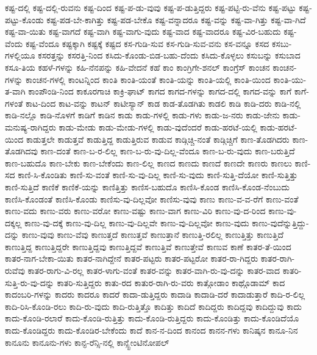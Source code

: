 {ಕಷ್ಟ-ದಲ್ಲಿ
ಕಷ್ಟ-ದಲ್ಲಿ-ರುವನು
ಕಷ್ಟ-ದಿಂದ
ಕಷ್ಟ-ಪ-ಡು-ವುವು
ಕಷ್ಟ-ಪ-ಡುತ್ತಿದ್ದರು
ಕಷ್ಟ-ಪಟ್ಟಿ-ರು-ವೆನು
ಕಷ್ಟ-ಪಟ್ಟು
ಕಷ್ಟ-ಪಟ್ಟು-ಕೊಂಡು
ಕಷ್ಟ-ಪಡ-ಬೇ-ಕಾಗಿತ್ತು
ಕಷ್ಟ-ಪಡ-ಬೇಕೊ
ಕಷ್ಟ-ವನ್ನಾದರೂ
ಕಷ್ಟ-ವನ್ನು
ಕಷ್ಟ-ವಾ-ಗಿತ್ತು
ಕಷ್ಟ-ವಾ-ಗಿದೆ
ಕಷ್ಟ-ವಾ-ಯಿತು
ಕಷ್ಟ-ವಾಗದೆ
ಕಷ್ಟ-ವಾಗಿ
ಕಷ್ಟ-ವಾಗು-ವುದು
ಕಷ್ಟ-ವಾದ
ಕಷ್ಟ-ವಾದರೂ
ಕಷ್ಟ-ವಿರ-ಬಹುದು
ಕಷ್ಟ-ವೆಂದು
ಕಷ್ಟ-ವೆಂದೂ
ಕಷ್ಟಕ್ಕಾಗಿ
ಕಷ್ಟಕ್ಕೆ
ಕಷ್ಟದ
ಕಸ-ಗುಡಿ-ಸುವ
ಕಸ-ಗುಡಿ-ಸುವ-ವನು
ಕಸ-ವನ್ನೂ
ಕಸದ
ಕಸಬು-ಗಳಲ್ಲಿಯೂ
ಕಸರತ್ತನ್ನು
ಕಸರತ್ತಿ-ನಿಂದ
ಕಸಿದು-ಕೊಂಡು-ಬಿಡ-ಬಹು-ದೆಂದು
ಕಸಿದು-ಕೊಳ್ಳಲು
ಕಸುಬನ್ನು
ಕಸುಬಾದ
ಕಸೂ-ತಿಯ
ಕಹಳೆ-ಗಳನ್ನು
ಕಹಿ-ನೆನಪನ್ನು
ಕಹಿ-ವೇದನೆ
ಕಹೆ
ಕಾಂ
ಕಾಂಗ್ರಿಗೇ-ಶನಲ್
ಕಾಂಗ್ರೆಸ್
ಕಾಂಚನ
ಕಾಂಚನ-ಗಳನ್ನು
ಕಾಂಚನ-ಗಳಲ್ಲಿ
ಕಾಂಟನ್ನಿಂದ
ಕಾಂತಿ
ಕಾಂತಿ-ಯಂತೆ
ಕಾಂತಿ-ಯನ್ನು
ಕಾಂತಿ-ಯಲ್ಲಿ
ಕಾಂತಿ-ಯಿಂದ
ಕಾಂತಿ-ಯು-ತ-ವಾಗಿ
ಕಾಂಪೌಂಡಿ-ನಿಂದ
ಕಾಕೂರಗಾಚಿ
ಕಾಕ್ರಿ-ಘಾಟ್
ಕಾಗದ
ಕಾಗದ-ಗಳನ್ನು
ಕಾಗದ-ದಲ್ಲಿ
ಕಾಗದ-ವನ್ನು
ಕಾಗೆ
ಕಾಗೆ-ಗಳಂತೆ
ಕಾಟ-ದಿಂದ
ಕಾಟ-ವನ್ನು
ಕಾಟನ್
ಕಾಟೀಸ್ಯಾನ್
ಕಾಡ
ಕಾಡ-ತೊಡಗಿತು
ಕಾಡಲಿ
ಕಾಡಿ
ಕಾಡಿ-ದರು
ಕಾಡಿ-ನಲ್ಲಿ
ಕಾಡಿ-ನಲ್ಲೊ
ಕಾಡಿ-ನೊಳಗೆ
ಕಾಡಿಗೆ
ಕಾಡಿನ
ಕಾಡು
ಕಾಡು-ಗಳಲ್ಲಿ
ಕಾಡು-ಗಳು
ಕಾಡು-ಜ-ನರು
ಕಾಡು-ಜೇನು
ಕಾಡು-ಮನುಷ್ಯ-ರಾಗಿದ್ದರು
ಕಾಡು-ಮೇಡು
ಕಾಡು-ಮೇಡು-ಗಳಲ್ಲಿ
ಕಾಡು-ವುದೆಂದರೆ
ಕಾಡು-ಹರಟೆ-ಯಲ್ಲಿ
ಕಾಡು-ಹರಟೆ-ಯಿಂದ
ಕಾಡುತ್ತಲೇ
ಕಾಡುತ್ತವೆ
ಕಾಡುತ್ತಿದ್ದ
ಕಾಡುತ್ತಿರುವ
ಕಾಡುವ
ಕಾಡ್ಗಿಚ್ಚಿ-ನಂತೆ
ಕಾಡ್ಗಿಚ್ಚಿಗೆ
ಕಾಣ-ತೊಡಗಿದರು
ಕಾಣ-ತೊಡಗಿದವು
ಕಾಣ-ದಂತೆ
ಕಾಣ-ಬ-ರ-ಲಿಲ್ಲ
ಕಾಣ-ಬ-ರು-ವು-ದಿಲ್ಲ-ವೆಂದೂ
ಕಾಣ-ಬ-ರು-ವುದು
ಕಾಣ-ಬರುತ್ತಿದೆ
ಕಾಣ-ಬಹುದೊ
ಕಾಣ-ಬೇಕು
ಕಾಣ-ಬೇಕೆಂದು
ಕಾಣ-ಲಿಲ್ಲ
ಕಾಣದ
ಕಾಣದು
ಕಾಣದೆ
ಕಾಣದೇ
ಕಾಣರು
ಕಾಣಲು
ಕಾಣಿ-ಸದ
ಕಾಣಿ-ಸಿ-ಕೊಂಡಿತು
ಕಾಣಿ-ಸು-ವಂತೆ
ಕಾಣಿ-ಸು-ವು-ದಿಲ್ಲ
ಕಾಣಿ-ಸು-ವುದು
ಕಾಣಿ-ಸುತ್ತಿ-ದೆಯೋ
ಕಾಣಿ-ಸುತ್ತಿತ್ತು
ಕಾಣಿ-ಸುತ್ತಿದೆ
ಕಾಣಿಕೆ
ಕಾಣಿಕೆ-ಯನ್ನು
ಕಾಣಿತ್ತಿತ್ತು
ಕಾಣಿಸ-ಬಹುದೊ
ಕಾಣಿಸಿ-ಕೊಂಡ
ಕಾಣಿಸಿ-ಕೊಂಡ-ನೆಂಬುದು
ಕಾಣಿಸಿ-ಕೊಂಡಂತೆ
ಕಾಣಿಸಿ-ಕೊಂಡು
ಕಾಣಿಸು-ವು-ದಿಲ್ಲವೋ
ಕಾಣಿಸು-ವುವು
ಕಾಣು
ಕಾಣು-ವ-ವ-ರೆಗೆ
ಕಾಣು-ವಂತೆ
ಕಾಣು-ವದು
ಕಾಣು-ವರು
ಕಾಣು-ವರೋ
ಕಾಣು-ವಷ್ಟು
ಕಾಣು-ವಾಗ
ಕಾಣು-ವಿರಿ
ಕಾಣು-ವು-ದ-ರಿಂದ
ಕಾಣು-ವು-ದಕ್ಕಲ್ಲ
ಕಾಣು-ವು-ದಕ್ಕೆ
ಕಾಣು-ವು-ದಿಲ್ಲ
ಕಾಣು-ವು-ದಿಲ್ಲವೇ
ಕಾಣು-ವು-ದಿಲ್ಲವೋ
ಕಾಣು-ವುದು
ಕಾಣು-ವುದೆನ್ನುತ್ತಿದ್ದು-ದನ್ನು
ಕಾಣು-ವುವು
ಕಾಣು-ವೆವು
ಕಾಣುತ್ತದೆ
ಕಾಣುತ್ತವೆ
ಕಾಣುತ್ತಾನೆ
ಕಾಣುತ್ತಿ-ರಲಿಲ್ಲ
ಕಾಣುತ್ತಿತ್ತು
ಕಾಣುತ್ತಿದೆ
ಕಾಣುತ್ತಿದ್ದ
ಕಾಣುತ್ತಿದ್ದರೇ
ಕಾಣುತ್ತಿದ್ದವು
ಕಾಣುತ್ತಿದ್ದವೆ
ಕಾಣುತ್ತಿವೆ
ಕಾಣುತ್ತೇವೆ
ಕಾಣುವ
ಕಾಣೆ
ಕಾತರ-ತೆ-ಯಿಂದ
ಕಾತರ-ನಾಗ-ಬೇಕಾ-ಯಿತು
ಕಾತರ-ನಾಗಿದ್ದೇನೆ
ಕಾತರ-ಪಟ್ಟರು
ಕಾತರ-ಪಟ್ಟರೋ
ಕಾತರ-ರಾ-ಗಿದ್ದರು
ಕಾತರ-ರಾಗಿ-ರುವೆವು
ಕಾತರ-ರಾಗು-ವಿ-ರಲ್ಲ
ಕಾತರ-ಳಾಗು-ವಂತೆ
ಕಾತರ-ವನ್ನು
ಕಾತರ-ವಾಗಿ-ರು-ವು-ದನ್ನು
ಕಾತರ-ವಾದ
ಕಾತರಿ-ಸುತ್ತಿ-ರು-ವು-ದನ್ನು
ಕಾತರಿ-ಸುತ್ತಿದ್ದರು
ಕಾತು-ರದ
ಕಾತುರ-ರಾಗಿ-ರು-ವರು
ಕಾತ್ಗೋಡಾಂ
ಕಾಥ್ಗೊಡಾಮ್
ಕಾದ
ಕಾದಂಬರಿ-ಗಳನ್ನು
ಕಾದರು
ಕಾದರೂ
ಕಾದರೆ
ಕಾದಾ-ಡುತ್ತಿದ್ದರು
ಕಾದಾಡಿ
ಕಾದಾಡಿ-ದರೆ
ಕಾದಾಡುತ್ತಾರೆ
ಕಾದಿ-ರ-ಲಿಲ್ಲ
ಕಾದಿ-ರಿಸಿ-ಕೊಂಡಿ-ರಲು
ಕಾದಿ-ರು-ವುದು
ಕಾದಿ-ರುತ್ತಿತ್ತೊ
ಕಾದಿತ್ತು
ಕಾದಿದೆ
ಕಾದಿದ್ದರು
ಕಾದಿದ್ದವು
ಕಾದಿದ್ದುವು
ಕಾದು
ಕಾದು-ಕೊಂಡಿ-ರಲಾರೆ
ಕಾದು-ಕೊಂಡಿ-ರುತ್ತಿತ್ತು
ಕಾದು-ಕೊಂಡಿ-ರುತ್ತಿದ್ದರು
ಕಾದು-ಕೊಂಡಿತ್ತು
ಕಾದು-ಕೊಂಡಿದೆಯೊ
ಕಾದು-ಕೊಂಡಿದ್ದರು
ಕಾದು-ಕೊಂಡಿರ-ಬೇಕೆಂದು
ಕಾದೆ
ಕಾನ-ನ-ದಿಂದ
ಕಾನಂದ
ಕಾನನ-ಗಳು
ಕಾನಿಷ್ಕನ
ಕಾನೂ-ನಿನ
ಕಾನೂನು
ಕಾನೂನು-ಗಳು
ಕಾನ್ಫ-ರೆನ್ಸಿ-ನಲ್ಲಿ
ಕಾನ್ಸ್ಟೇಂಟಿನೋಪಲ್
}
